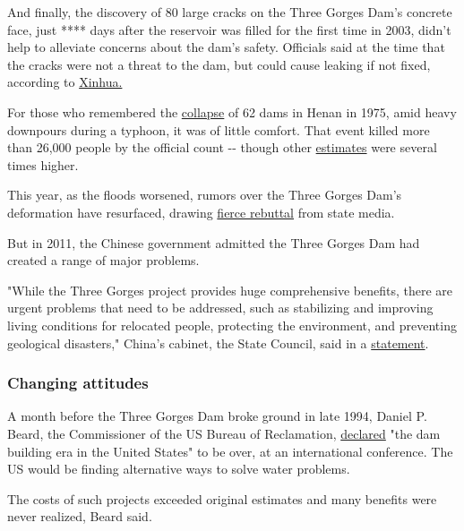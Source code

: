 And finally, the discovery of 80 large cracks on the Three Gorges Dam's
concrete face, just **** days after the reservoir was filled for the
first time in 2003, didn't help to alleviate concerns about the dam's
safety. Officials said at the time that the cracks were not a threat to
the dam, but could cause leaking if not fixed, according to
\href{https://www.chinadaily.com.cn/en/doc/2003-06/10/content_242838.htm}{Xinhua.}

For those who remembered the
\href{http://en.people.cn/200510/01/eng20051001_211892.html}{collapse}
of 62 dams in Henan in 1975, amid heavy downpours during a typhoon, it
was of little comfort. That event killed more than 26,000 people by the
official count -\/- though other
\href{https://www.internationalrivers.org/resources/the-forgotten-legacy-of-the-banqiao-dam-collapse-7821}{estimates}
were several times higher.

This year, as the floods worsened, rumors over the Three Gorges Dam's
deformation have resurfaced, drawing
\href{https://www.globaltimes.cn/content/1195239.shtml}{fierce rebuttal}
from state media.

But in 2011, the Chinese government admitted the Three Gorges Dam had
created a range of major problems.

"While the Three Gorges project provides huge comprehensive benefits,
there are urgent problems that need to be addressed, such as stabilizing
and improving living conditions for relocated people, protecting the
environment, and preventing geological disasters," China's cabinet, the
State Council, said in a
\href{http://www.gov.cn/ldhd/2011-05/18/content_1866289.htm}{statement}.

\hypertarget{changing-attitudes}{%
\subsubsection{Changing attitudes}\label{changing-attitudes}}

A month before the Three Gorges Dam broke ground in late 1994, Daniel P.
Beard, the Commissioner of the US Bureau of Reclamation,
\href{https://www.govinfo.gov/content/pkg/CREC-1994-12-20/html/CREC-1994-12-20-pt1-PgE12.htm}{declared}
"the dam building era in the United States" to be over, at an
international conference. The US would be finding alternative ways to
solve water problems.

The costs of such projects exceeded original estimates and many benefits
were never realized, Beard said.

